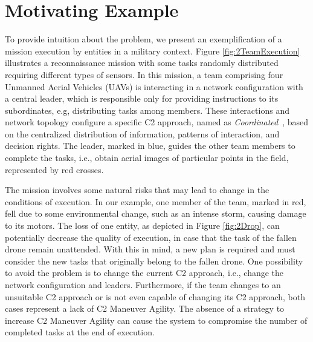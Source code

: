 \section{Motivating Example}
\label{sec:motivation}

To provide intuition about the problem, we present an exemplification of a mission execution by entities in a military context. Figure \ref{fig:2TeamExecution} illustrates a reconnaissance mission with some tasks randomly distributed requiring different types of sensors. In this mission, a team comprising four Unmanned Aerial Vehicles (UAVs) is interacting in a network configuration with a central leader, which is responsible only for providing instructions to its subordinates, e.g, distributing tasks among members. These interactions and network topology configure a specific C2 approach, named as \textit{Coordinated}~\citep{france2014}, based on the centralized distribution of information, patterns of interaction, and decision rights. The leader, marked in blue, guides the other team members to complete the tasks, i.e., obtain aerial images of particular points in the field, represented by red crosses.

The mission involves some natural risks that may lead to change in the conditions of execution. In our example, one member of the team, marked in red, fell due to some environmental change, such as an intense storm, causing damage to its motors. The loss of one entity, as depicted in Figure \ref{fig:2Drop}, can potentially decrease the quality of execution, in case that the task of the fallen drone remain unattended. With this in mind, a new plan is required and must consider the new tasks that originally belong to the fallen drone. One possibility to avoid the problem is to change the current C2 approach, i.e., change the network configuration and leaders. Furthermore, if the team changes to an unsuitable C2 approach or is not even capable of changing its C2 approach, both cases represent a lack of C2 Maneuver Agility. The absence of a strategy to increase C2 Maneuver Agility can cause the system to compromise the number of completed tasks at the end of execution. 

